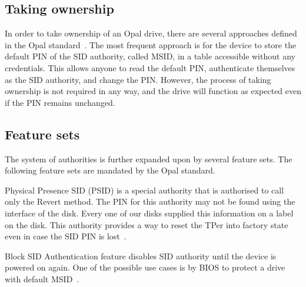\subsection{Taking ownership}


In order to take ownership of an Opal drive, there are several approaches defined in the Opal standard~\cite{tcg-opal2}. The most frequent approach is for the device to store the default PIN of the SID authority, called MSID, in a table accessible without any credentials. This allows anyone to read the default PIN, authenticate themselves as the SID authority, and change the PIN. However, the process of taking ownership is not required in any way, and the drive will function as expected even if the PIN remains unchanged.



\subsection{Feature sets}

The system of authorities is further expanded upon by several feature sets.
The following feature sets are mandated by the Opal standard.

Physical Presence SID (PSID) is a special authority that is authorised to call only the Revert method. The PIN for this authority may not be found using the interface of the disk. Every one of our disks supplied this information on a label on the disk. This authority provides a way to reset the TPer into factory state even in case the SID PIN is lost~\cite{tcg-psid}.

Block SID Authentication feature disables SID authority until the device is powered on again. One of the possible use cases is by BIOS to protect a drive with default MSID~\cite{tcg-block-sid-auth}.


